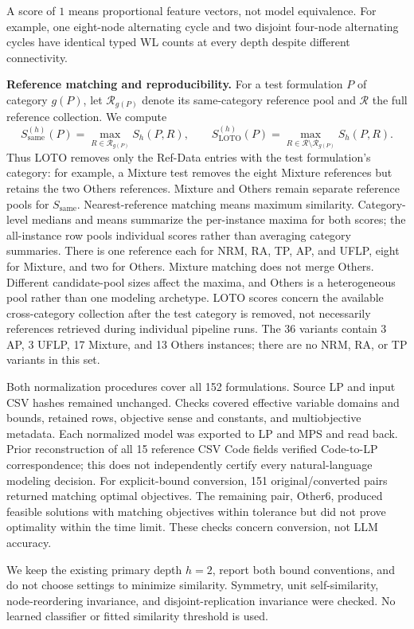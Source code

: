 \documentclass[11pt]{article}
\begin{document}
\begin{enumerate}[label=(AssoE.\arabic*),leftmargin=*]
A score of $1$ means proportional feature vectors, not model equivalence.
For example, one eight-node alternating cycle and two disjoint
four-node alternating cycles have identical typed WL counts at every
depth despite different connectivity.

\medskip
\textbf{Reference matching and reproducibility.}
For a test formulation $P$ of category $g(P)$, let
$\mathcal R_{g(P)}$ denote its same-category reference pool and
$\mathcal R$ the full reference collection. We compute
\[
 S_{\mathrm{same}}^{(h)}(P)
 =\max_{R\in\mathcal R_{g(P)}}S_h(P,R),
 \qquad
 S_{\mathrm{LOTO}}^{(h)}(P)
 =\max_{R\in\mathcal R\setminus\mathcal R_{g(P)}}S_h(P,R).
\]
Thus LOTO removes only the Ref-Data entries with the test formulation's
category: for example, a Mixture test removes the eight Mixture
references but retains the two Others references. Mixture and Others
remain separate reference pools for $S_{\mathrm{same}}$.
Nearest-reference matching means maximum similarity. Category-level
medians and means summarize the per-instance maxima for both scores;
the all-instance row pools individual scores rather than averaging
category summaries.
There is one reference each for NRM, RA, TP, AP, and UFLP, eight for
Mixture, and two for Others. Mixture matching does not merge Others.
Different candidate-pool sizes affect the maxima, and Others is a
heterogeneous pool rather than one modeling archetype.
LOTO scores concern the available cross-category collection after the
test category is removed, not necessarily references retrieved during
individual pipeline runs.
The 36 variants contain 3 AP, 3 UFLP, 17 Mixture, and 13 Others
instances; there are no NRM, RA, or TP variants in this set.

Both normalization procedures cover all 152 formulations.
Source LP and input CSV hashes remained unchanged.
Checks covered effective variable domains and bounds, retained rows,
objective sense and constants, and multiobjective metadata.
Each normalized model was exported to LP and MPS and read back.
Prior reconstruction of all 15 reference CSV Code fields verified
Code-to-LP correspondence; this does not independently certify every
natural-language modeling decision.
For explicit-bound conversion, 151 original/converted pairs returned
matching optimal objectives. The remaining pair, Other6, produced
feasible solutions with matching objectives within tolerance but did
not prove optimality within the time limit.
These checks concern conversion, not LLM accuracy.

We keep the existing primary depth $h=2$, report both bound conventions,
and do not choose settings to minimize similarity.
Symmetry, unit self-similarity, node-reordering invariance, and
disjoint-replication invariance were checked.
No learned classifier or fitted similarity threshold is used.


\end{enumerate}
\end{document}
